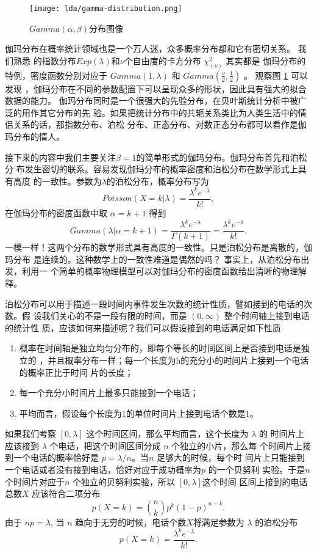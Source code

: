 {\begin{figure}[htbp]
\centering
\texttt{[image: lda/gamma-distribution.png]}
\caption{\label{gamma-distr-graph}$ Gamma(\alpha,\beta)$分布图像}
\end{figure}

伽玛分布在概率统计领域也是一个万人迷，众多概率分布都和它有密切关系。 我们熟悉
的指数分布$Exp(\lambda)$和$\nu$个自由度的卡方分布 $\chi^2_{(\nu)}$ 其实都是
伽玛分布的特例，密度函数分别对应于 $Gamma(1, \lambda)$ 和
$Gamma(\frac{\nu}{2}, \frac{1}{2})$ 。 观察图 \ref{gamma-distr-graph} 可以发现
，伽玛分布在不同的参数配置下可以呈现众多的形状，因此具有强大的拟合数据的能力。
伽玛分布同时是一个很强大的先验分布，在贝叶斯统计分析中被广泛的用作其它分布的先
验。如果把统计分布中的共轭关系类比为人类生活中的情侣关系的话，那指数分布、泊松
分布、正态分布、对数正态分布都可以看作是伽玛分布的情人。

接下来的内容中我们主要关注$\beta = 1$的简单形式的伽玛分布。伽玛分布首先和泊松分
布发生密切的联系。容易发现伽玛分布的概率密度和泊松分布在数学形式上具有高度
的一致性。参数为$\lambda$的泊松分布，概率分布写为
$$Poisson(X=k|\lambda) = \frac{\lambda^k e^{-\lambda}}{k!} , $$
在伽玛分布的密度函数中取 $\alpha = k+1$ 得到
$$ Gamma(\lambda|\alpha=k+1) 
= \frac{\lambda^ke^{-\lambda}}{\Gamma(k+1)}= \frac{\lambda^k e^{-\lambda}}{k!} . $$
一模一样！这两个分布的数学形式具有高度的一致性。只是泊松分布是离散的，伽玛分布
是连续的。这种数学上的一致性难道是偶然的吗？ 事实上，从泊松分布出发，利用一
个简单的概率物理模型可以对伽玛分布的密度函数给出清晰的物理解释。

泊松分布可以用于描述一段时间内事件发生次数的统计性质，譬如接到的电话的次数。假
设我们关心的不是一段有限的时间，而是 $(0, \infty)$ 整个时间轴上接到电话的统计性
质，应该如何来描述呢？我们可以假设接到的电话满足如下性质
\begin{enumerate}
\item 概率在时间轴是独立均匀分布的，即每个等长的时间区间上是否接到电话是独立的
，并且概率分布一样；每一个长度为h的充分小的时间片上接到一个电话的概率正比于时间
片的长度；
\item 每一个充分小时间片上最多只能接到一个电话；
\item 平均而言，假设每个长度为1的单位时间片上接到电话个数是1。
\end{enumerate}
如果我们考察 $[0, \lambda]$ 这个时间区间，那么平均而言，这个长度为 $\lambda$ 的
时间片上应该接到 $\lambda$ 个电话，把这个时间区间分成 $n$ 个独立的小片，那么每
个时间片上接到一个电话的概率恰好是 $p = \lambda/n$。当$n$ 足够大的时候，每个时
间片上只能接到一个电话或者没有接到电话，恰好对应于成功概率为$p$ 的一个贝努利
实验。于是$n$ 个时间片对应于$n$ 个独立的贝努利实验，所以 $[0, \lambda]$这个时间
区间上接到的电话总数$X$ 应该符合二项分布
$$p(X=k) = \binom{n}{k} p^k(1-p)^{n-k} .$$
由于 $np= \lambda$, 当 $n$ 趋向于无穷的时候，电话个数$X$将满足参数为
$\lambda$ 的泊松分布
$$p(X=k) = \frac{\lambda^k e^{-\lambda}}{k!} .$$

}
